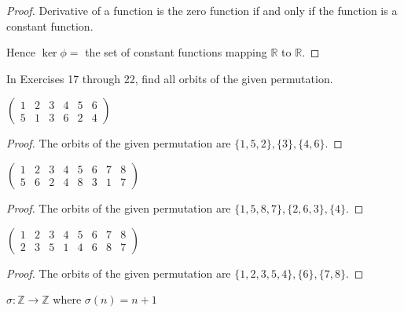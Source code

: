 \begin{proof}
    Derivative of a function is the zero function if and only if the function is a constant function.

    Hence $\ker\phi =$ the set of constant functions mapping $\mathbb{R}$ to $\mathbb{R}$.
\end{proof}

In Exercises 17 through 22, find all orbits of the given permutation.

\begin{exercise}
    $\begin{pmatrix}
            1 & 2 & 3 & 4 & 5 & 6 \\
            5 & 1 & 3 & 6 & 2 & 4
        \end{pmatrix}$
\end{exercise}

\begin{proof}
    The orbits of the given permutation are $\{ 1, 5, 2 \}, \{ 3 \}, \{ 4, 6 \}$.
\end{proof}

\begin{exercise}
    $\begin{pmatrix}
            1 & 2 & 3 & 4 & 5 & 6 & 7 & 8 \\
            5 & 6 & 2 & 4 & 8 & 3 & 1 & 7
        \end{pmatrix}$
\end{exercise}

\begin{proof}
    The orbits of the given permutation are $\{ 1, 5, 8, 7 \}, \{ 2, 6, 3 \}, \{ 4 \}$.
\end{proof}

\begin{exercise}
    $\begin{pmatrix}
            1 & 2 & 3 & 4 & 5 & 6 & 7 & 8 \\
            2 & 3 & 5 & 1 & 4 & 6 & 8 & 7
        \end{pmatrix}$
\end{exercise}

\begin{proof}
    The orbits of the given permutation are $\{ 1, 2, 3, 5, 4 \}, \{ 6 \}, \{ 7, 8 \}$.
\end{proof}

\begin{exercise}
    $\sigma: \mathbb{Z} \to \mathbb{Z}$ where $\sigma(n) = n + 1$
\end{exercise}

